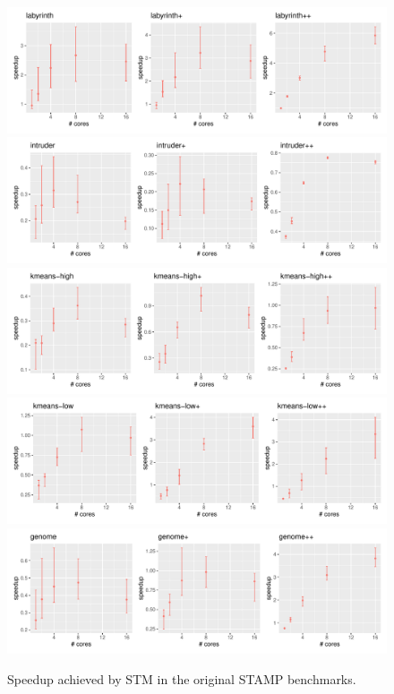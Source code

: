 \begin{figure}
    \centering
    \includegraphics[width=\textwidth,keepaspectratio]{gfx/results/stamp/stamp_labyrinth_comb}
    \includegraphics[width=\textwidth,keepaspectratio]{gfx/results/stamp/stamp_intruder_comb}
    \includegraphics[width=\textwidth,keepaspectratio]{gfx/results/stamp/stamp_kmeans-high_comb}
    \includegraphics[width=\textwidth,keepaspectratio]{gfx/results/stamp/stamp_kmeans-low_comb}
    \includegraphics[width=\textwidth,keepaspectratio]{gfx/results/stamp/stamp_genome_comb}
    \caption{Speedup achieved by STM in the original STAMP  benchmarks.}%
    \label{fig:evaluation:stamp}
\end{figure}

